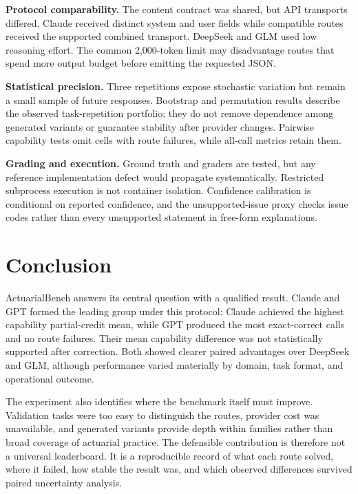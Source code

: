 \documentclass[11pt]{article}
\begin{document}
\textbf{Protocol comparability.} The content contract was shared, but API transports differed. Claude received distinct system and user fields while compatible routes received the supported combined transport. DeepSeek and GLM used low reasoning effort. The common 2,000-token limit may disadvantage routes that spend more output budget before emitting the requested JSON.

\textbf{Statistical precision.} Three repetitions expose stochastic variation but remain a small sample of future responses. Bootstrap and permutation results describe the observed task-repetition portfolio; they do not remove dependence among generated variants or guarantee stability after provider changes. Pairwise capability tests omit cells with route failures, while all-call metrics retain them.

\textbf{Grading and execution.} Ground truth and graders are tested, but any reference implementation defect would propagate systematically. Restricted subprocess execution is not container isolation. Confidence calibration is conditional on reported confidence, and the unsupported-issue proxy checks issue codes rather than every unsupported statement in free-form explanations.

\section{Conclusion}

ActuarialBench answers its central question with a qualified result. Claude and GPT formed the leading group under this protocol: Claude achieved the highest capability partial-credit mean, while GPT produced the most exact-correct calls and no route failures. Their mean capability difference was not statistically supported after correction. Both showed clearer paired advantages over DeepSeek and GLM, although performance varied materially by domain, task format, and operational outcome.

The experiment also identifies where the benchmark itself must improve. Validation tasks were too easy to distinguish the routes, provider cost was unavailable, and generated variants provide depth within families rather than broad coverage of actuarial practice. The defensible contribution is therefore not a universal leaderboard. It is a reproducible record of what each route solved, where it failed, how stable the result was, and which observed differences survived paired uncertainty analysis.

\appendix
\clearpage
\end{document}
